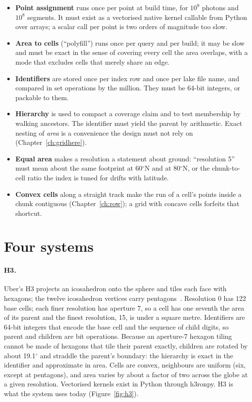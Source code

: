\documentclass[10pt,a4paper]{article}
\begin{document}
\begin{itemize}
\item \textbf{Point assignment} runs once per point at build time, for $10^{9}$ photons and $10^{8}$ segments. It
  must exist as a vectorised native kernel callable from Python over arrays; a scalar call per point is two orders of
  magnitude too slow.
\item \textbf{Area to cells} (``polyfill'') runs once per query and per build; it may be slow and must be exact
  in the sense of covering every cell the area overlaps, with a mode that excludes cells that merely share an edge.
\item \textbf{Identifiers} are stored once per index row and once per lake file name, and compared in set
  operations by the million. They must be 64-bit integers, or packable to them.
\item \textbf{Hierarchy} is used to compact a coverage claim and to test membership by walking ancestors. The
  identifier must yield the parent by arithmetic. Exact nesting of \emph{area} is a convenience the design must not
  rely on (Chapter~\ref{ch:gridhere}).
\item \textbf{Equal area} makes a resolution a statement about ground: ``resolution 5'' must mean about the same
  footprint at 60$^\circ$N and at 80$^\circ$N, or the chunk-to-cell ratio the index is tuned for drifts with
  latitude.
\item \textbf{Convex cells} along a straight track make the run of a cell's points inside a chunk contiguous
  (Chapter~\ref{ch:row}); a grid with concave cells forfeits that shortcut.
\end{itemize}

\section{Four systems}
\label{ch:foursystems}

\paragraph{H3.} Uber's H3 projects an icosahedron onto the sphere and tiles each face with hexagons; the twelve
icosahedron vertices carry pentagons~\citep{h3docs}. Resolution 0 has 122 base cells; each finer resolution has
aperture 7, so a cell has one seventh the area of its parent and the finest resolution, 15, is under a square metre.
Identifiers are 64-bit integers that encode the base cell and the sequence of child digits, so parent and children
are bit operations. Because an aperture-7 hexagon tiling cannot be made of hexagons that tile their parent exactly,
children are rotated by about 19.1$^\circ$ and straddle the parent's boundary: the hierarchy is exact in the
identifier and approximate in area. Cells are convex, neighbours are uniform (six, except at pentagons), and area
varies by about a factor of two across the globe at a given resolution. Vectorised kernels exist in Python through
h3ronpy. H3 is what the system uses today (Figure~\ref{fig:h3}).
\end{document}
